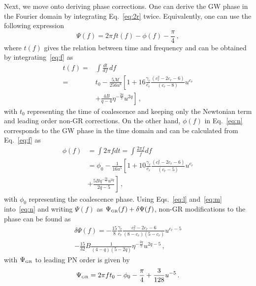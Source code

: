\documentclass[prd,twocolumn,nofootinbib]{revtex4-1}
\newcommand{\GR}{{\mbox{\tiny GR}}}
\begin{document}
Next, we move onto deriving phase corrections. One can derive the GW phase in the Fourier domain by integrating Eq.~\eqref{eq:2r} twice. Equivalently, one can use the following expression
\begin{equation}\label{eq:n}
\Psi(f)=2\pi f t(f)-\phi(f)-\frac{\pi}{4}\,,
\end{equation}
where $t(f)$ gives the relation between time and frequency and can be obtained by integrating~\eqref{eq:f} as
\begin{align}\label{eq:l}
t(f)=&\int \frac{dt}{df} \, df\nonumber\\=&t_0 -\frac{5 \mathcal{M}}{256 u^8}\left[1+16\frac{\gamma_r}{c_r}\frac{(c_r^2-2c_r-6)}{(c_r-8)}u^{c_r}\right.\nonumber\\ &\left. +\frac{4 B}{q-4}\eta ^{-\frac{2q}{5}} u^{2q}\right]\,,
\end{align}
with $t_0$ representing the time of coalescence and keeping only the Newtonian term and leading order non-GR corrections. On the other hand, $\phi(f)$ in Eq.~\eqref{eq:n} corresponds to the GW phase in the time domain and can be calculated from Eq.~\eqref{eq:f} as
\begin{align}\label{eq:m}
\phi(f)&=\int 2 \pi f dt=\int\frac{2\pi f}{\dot{f}}df\nonumber\\
&=\phi_0 -\frac{1}{16 u^5}\left[1+10\frac{\gamma_r}{c_r}\frac{\left(c_r^2-2 c_r-6\right)}{(c_r-5)}u^{c_r} \right. \nonumber \\
& \left. +\frac{5B \eta ^{-\frac{2 q}{5}} u^{2 q}}{2 q-5}\right]\,,
\end{align}
with $\phi_0$ representing the coalescence phase. Using Eqs.~\eqref{eq:l} and~\eqref{eq:m} into~\eqref{eq:n} and writing $\Psi(f)$ as $\Psi_{\GR}(f)+\delta\Psi(f)$, non-GR modifications to the phase can be found as
 \begin{align}\label{eq:p}
\delta\Psi(f)=-\frac{15}{8}\frac{\gamma_r}{c_r}\frac{c_r^2-2c_r-6}{(8-c_r)(5-c_r)}u^{c_r-5}\nonumber\\ -\frac{15}{32}B\frac{1}{(4-q)(5-2q)}\eta^{-\frac{2q}{5}}u^{2q-5}\,,
 \end{align}
with $\Psi_{\GR}$ to leading PN order is given by \cite{Blanchet:1995ez}
\begin{equation}
\label{eq:Psi_GR}
\Psi_{\GR}=2\pi f t_0-\phi_0-\frac{\pi}{4}+\frac{3}{128}u^{-5}\,.
\end{equation}

%
%

\end{document}

